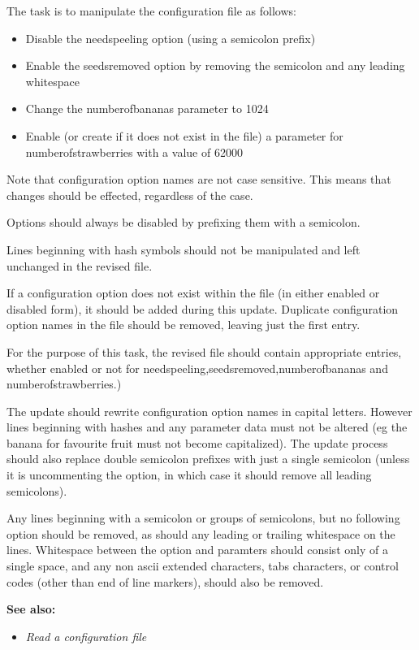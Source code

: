 The task is to manipulate the configuration file as follows:

\begin{itemize}
\item
  Disable the needspeeling option (using a semicolon prefix)
\item
  Enable the seedsremoved option by removing the semicolon and any
  leading whitespace
\item
  Change the numberofbananas parameter to 1024
\item
  Enable (or create if it does not exist in the file) a parameter for
  numberofstrawberries with a value of 62000
\end{itemize}

Note that configuration option names are not case sensitive. This means
that changes should be effected, regardless of the case.

Options should always be disabled by prefixing them with a semicolon.

Lines beginning with hash symbols should not be manipulated and left
unchanged in the revised file.

If a configuration option does not exist within the file (in either
enabled or disabled form), it should be added during this update.
Duplicate configuration option names in the file should be removed,
leaving just the first entry.

For the purpose of this task, the revised file should contain
appropriate entries, whether enabled or not for
needspeeling,seedsremoved,numberofbananas and numberofstrawberries.)

The update should rewrite configuration option names in capital letters.
However lines beginning with hashes and any parameter data must not be
altered (eg the banana for favourite fruit must not become capitalized).
The update process should also replace double semicolon prefixes with
just a single semicolon (unless it is uncommenting the option, in which
case it should remove all leading semicolons).

Any lines beginning with a semicolon or groups of semicolons, but no
following option should be removed, as should any leading or trailing
whitespace on the lines. Whitespace between the option and paramters
should consist only of a single space, and any non ascii extended
characters, tabs characters, or control codes (other than end of line
markers), should also be removed.

\textbf{See also:}

\begin{itemize}
\item
  \emph{Read a configuration file}
\end{itemize}


